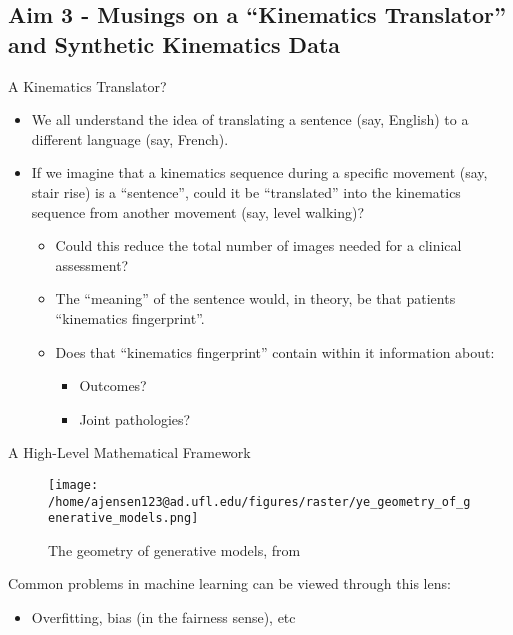 \documentclass[presentation, aspectratio=1610]{beamer}
\begin{document}
\subsection{Aim 3 - Musings on a ``Kinematics Translator'' and Synthetic Kinematics Data}
\label{sec:org2fabf09}
\begin{frame}[label={sec:org4e9fe91}]{A Kinematics Translator?}
\begin{itemize}
\item We all understand the idea of translating a sentence (say, English) to a different language (say, French).
\item If we imagine that a kinematics sequence during a specific movement (say, stair rise) is a ``sentence'', could it be ``translated'' into the kinematics sequence from another movement (say, level walking)?
\begin{itemize}
\item Could this reduce the total number of images needed for a clinical assessment?
\item The ``meaning'' of the sentence would, in theory, be that patients ``kinematics fingerprint''.
\item Does that ``kinematics fingerprint'' contain within it information about:
\begin{itemize}
\item Outcomes?
\item Joint pathologies?
\end{itemize}
\end{itemize}
\end{itemize}
\end{frame}
\begin{frame}[label={sec:orgc8c6907}]{A High-Level Mathematical Framework}
\begin{figure}[htbp]
\centering
\texttt{[image: /home/ajensen123@ad.ufl.edu/figures/raster/ye\_geometry\_of\_generative\_models.png]}
\caption{The geometry of generative models, from \autocite{yeGeometryDeepLearning2022}}
\end{figure}

Common problems in machine learning can be viewed through this lens:
\begin{itemize}
\item Overfitting, bias (in the fairness sense), etc
\end{itemize}
\end{frame}
\end{document}
